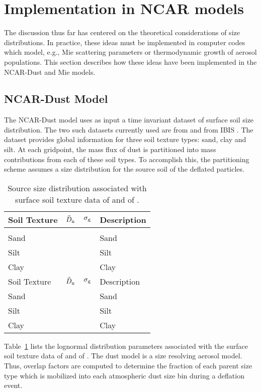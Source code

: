 \documentclass[12pt,twoside]{article}
\begin{document}
\section{Implementation in NCAR models}

The discussion thus far has centered on the theoretical considerations
of size distributions.
In practice, these ideas must be implemented in computer codes which
model, e.g., Mie scattering parameters or thermodynamic growth of
aerosol populations.
This section describes how these ideas have been implemented in the 
NCAR-Dust and Mie models.

\subsection[NCAR-Dust Model]{NCAR-Dust Model}
The NCAR-Dust model uses as input a time invariant dataset of surface
soil size distribution.
The two such datasets currently used are from \cite{WRL93} and from
IBIS \cite[]{Fol98}.
The \citeauthor{WRL93} dataset provides global information for three
soil texture types: sand, clay and silt.
At each gridpoint, the mass flux of dust is partitioned into mass
contributions from each of these soil types.
To accomplish this, the partitioning scheme assumes a size
distribution for the source soil of the deflated particles.
\begin{table}
\begin{center}
\begin{tabular}{lllp{10em}}
\hline
Soil Texture & $\tilde{D}_{\mathrm{n}}$ & $\sigma_{\mathrm{g}}$ & Description \\[0.0ex]
\hline
& & & \\[0.0ex]
Sand & & & Sand \\[0.5ex]
Silt & & & Silt \\[0.5ex]
Clay & & & Clay \\[0.5ex]
\hline
Soil Texture & $\tilde{D}_{\mathrm{n}}$ & $\sigma_{\mathrm{g}}$ & Description \\[0.0ex]
\hline
Sand & & & Sand \\[0.5ex]
Silt & & & Silt \\[0.5ex]
Clay & & & Clay \\[0.5ex]
\hline
\end{tabular}
\caption[Source Size Distribution]{Source size distribution associated
with surface soil texture data of \cite{WRL93} and of \cite{Fol98}.
\label{tbl:WRL93}}   
\end{center}
\end{table}
Table~\ref{tbl:WRL93} lists the lognormal distribution parameters
associated with the surface soil texture data of \cite{WRL93} and of
\cite{Fol98}. 
The dust model is a size resolving aerosol model. 
Thus, overlap factors are computed to determine the fraction of each
parent size type which is mobilized into each atmospheric dust size
bin during a deflation event.
\end{document}
